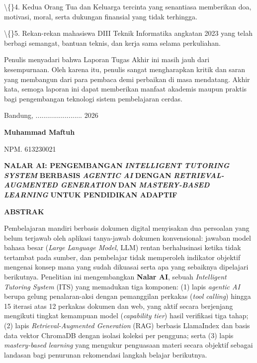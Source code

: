 \documentclass[12pt,a4paper]{article}
\begin{document}
\textbackslash\{\}4.	Kedua Orang Tua dan Keluarga tercinta yang senantiasa memberikan doa, motivasi, moral, serta dukungan finansial yang tidak terhingga.



\textbackslash\{\}5.	Rekan-rekan mahasiswa DIII Teknik Informatika angkatan 2023 yang telah berbagi semangat, bantuan teknis, dan kerja sama selama perkuliahan.



Penulis menyadari bahwa Laporan Tugas Akhir ini masih jauh dari kesempurnaan. Oleh karena itu, penulis sangat mengharapkan kritik dan saran yang membangun dari para pembaca demi perbaikan di masa mendatang. Akhir kata, semoga laporan ini dapat memberikan manfaat akademis maupun praktis bagi pengembangan teknologi sistem pembelajaran cerdas.



Bandung, ........................ 2026



\textbf{Muhammad Maftuh}



NPM. 613230021



\newpage

\textbf{NALAR AI: PENGEMBANGAN} \textbf{\textit{INTELLIGENT TUTORING SYSTEM}} \textbf{BERBASIS} \textbf{\textit{AGENTIC AI}} \textbf{DENGAN} \textbf{\textit{RETRIEVAL-AUGMENTED GENERATION}} \textbf{DAN} \textbf{\textit{MASTERY-BASED LEARNING}} \textbf{UNTUK PENDIDIKAN ADAPTIF}



\textbf{ABSTRAK}



Pembelajaran mandiri berbasis dokumen digital menyisakan dua persoalan yang belum terjawab oleh aplikasi tanya-jawab dokumen konvensional: jawaban model bahasa besar (\textit{Large Language Model}, LLM) rentan berhalusinasi ketika tidak tertambat pada sumber, dan pembelajar tidak memperoleh indikator objektif mengenai konsep mana yang sudah dikuasai serta apa yang sebaiknya dipelajari berikutnya. Penelitian ini mengembangkan \textbf{Nalar AI}, sebuah \textit{Intelligent Tutoring System} (ITS) yang memadukan tiga komponen: (1) lapis \textit{agentic AI} berupa gelung penalaran-aksi dengan pemanggilan perkakas (\textit{tool calling}) hingga 15 iterasi atas 12 perkakas dokumen dan web, yang aktif secara berjenjang mengikuti tingkat kemampuan model (\textit{capability tier}) hasil verifikasi tiga tahap; (2) lapis \textit{Retrieval-Augmented Generation} (RAG) berbasis LlamaIndex dan basis data vektor ChromaDB dengan isolasi koleksi per pengguna; serta (3) lapis \textit{mastery-based learning} yang mengukur penguasaan materi secara objektif sebagai landasan bagi penurunan rekomendasi langkah belajar berikutnya.
\end{document}
